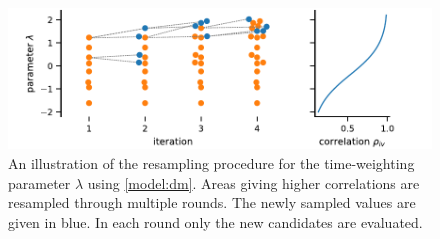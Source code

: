 \begin{figure}
    \centering
    \includegraphics[scale=0.65]{gfx/resampling.pdf}
    \caption[Resampling algorithm]{An illustration of the resampling procedure for the time-weighting parameter $\lambda$ using \autoref{model:dm}. Areas giving higher correlations are resampled through multiple rounds. The newly sampled values are given in blue. In each round only the new candidates are evaluated.}
    \label{fig:resampling}
\end{figure}


